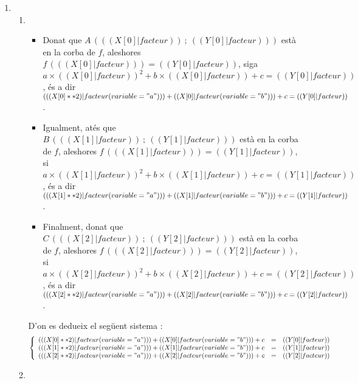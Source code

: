 \exercice*
\begin{enumerate}

  \item
    \begin{enumerate}
      \item
        \begin{itemize}
          \item Donat que $A\,( (( X[0]|facteur ))~;~(( Y[0]|facteur )) )$ està en la corba de $f$, aleshores $f\,( (( X[0]|facteur )) )=(( Y[0]|facteur ))$, siga            $a \times (( X[0]|facteur ))^2+b\times (( X[0]|facteur ))+c=(( Y[0]|facteur ))$,
            és a dir $(( (X[0]**2)|facteur(variable="a") )) + (( X[0]|facteur(variable="b") )) + c = (( Y[0]|facteur ))$.
          \item Igualment, atés que $B\,( (( X[1]|facteur ))~;~(( Y[1]|facteur )) )$ està en la corba de $f$, aleshores $f\,( (( X[1]|facteur )) )=(( Y[1]|facteur ))$, si
            $a \times (( X[1]|facteur ))^2+b\times (( X[1]|facteur ))+c=(( Y[1]|facteur ))$,
            és a dir $(( (X[1]**2)|facteur(variable="a") )) + (( X[1]|facteur(variable="b") )) + c = (( Y[1]|facteur ))$.
          \item Finalment, donat que $C\,( (( X[2]|facteur ))~;~(( Y[2]|facteur )) )$ està en la corba de $f$, aleshores $f\,( (( X[2]|facteur )) )=(( Y[2]|facteur ))$, si
            $a \times (( X[2]|facteur ))^2+b\times (( X[2]|facteur ))+c=(( Y[2]|facteur ))$,
            és a dir $(( (X[2]**2)|facteur(variable="a") )) + (( X[2]|facteur(variable="b") )) + c = (( Y[2]|facteur ))$.
        \end{itemize}

        D'on es dedueix el següent sistema :
        \[ \left\{\begin{array}{rcl}
            (( (X[0]**2)|facteur(variable="a") )) + (( X[0]|facteur(variable="b") )) + c &=& (( Y[0]|facteur )) \\
            (( (X[1]**2)|facteur(variable="a") )) + (( X[1]|facteur(variable="b") )) + c &=& (( Y[1]|facteur )) \\
            (( (X[2]**2)|facteur(variable="a") )) + (( X[2]|facteur(variable="b") )) + c &=& (( Y[2]|facteur )) \\
        \end{array}\right.\]
      \item


\end{enumerate}
\end{enumerate}
